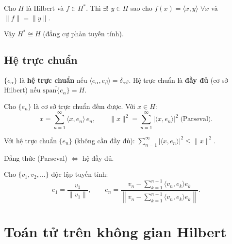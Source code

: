 \documentclass[12pt,a4paper]{article}
\begin{document}
\begin{dinhly}[title={Định lý biểu diễn Riesz}]
  Cho $H$ là Hilbert và $f \in H^*$. Thì $\exists!$ $y \in H$ sao cho $f(x) = \langle x, y \rangle$ $\forall x$ và $\|f\| = \|y\|$.

  Vậy $H^* \cong H$ (đẳng cự phản tuyến tính).
\end{dinhly}

\subsection{Hệ trực chuẩn}

\begin{dinhnghia}
  $\{e_\alpha\}$ là \textbf{hệ trực chuẩn} nếu $\langle e_\alpha, e_\beta \rangle = \delta_{\alpha\beta}$. Hệ trực chuẩn là \textbf{đầy đủ} (cơ sở Hilbert) nếu $\overline{\text{span}\{e_\alpha\}} = H$.
\end{dinhnghia}

\begin{dinhly}[title={Khai triển Fourier tổng quát}]
  Cho $\{e_n\}$ là cơ sở trực chuẩn đếm được. Với $x \in H$:
  \[
    x = \sum_{n=1}^{\infty} \langle x, e_n \rangle\, e_n, \qquad \|x\|^2 = \sum_{n=1}^{\infty} |\langle x, e_n \rangle|^2 \;\text{(Parseval)}.
  \]
\end{dinhly}

\begin{dinhly}[title={Bất đẳng thức Bessel}]
  Với hệ trực chuẩn $\{e_n\}$ (không cần đầy đủ): $\displaystyle\sum_{n=1}^{\infty} |\langle x, e_n \rangle|^2 \le \|x\|^2$.

  Đẳng thức (Parseval) $\Leftrightarrow$ hệ đầy đủ.
\end{dinhly}

\begin{phuongphap}[title={Trực chuẩn hóa Gram--Schmidt}]
  Cho $\{v_1, v_2, \ldots\}$ độc lập tuyến tính:
  \[
    e_1 = \frac{v_1}{\|v_1\|}, \qquad e_n = \frac{v_n - \sum_{k=1}^{n-1}\langle v_n, e_k \rangle e_k}{\left\|v_n - \sum_{k=1}^{n-1}\langle v_n, e_k \rangle e_k\right\|}.
  \]
\end{phuongphap}

\section{Toán tử trên không gian Hilbert}
\end{document}
